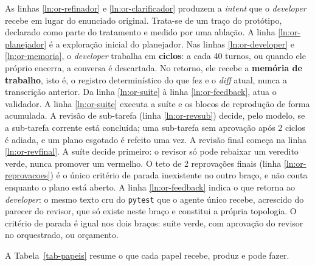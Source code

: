 As linhas \ref{ln:or-refinador} e \ref{ln:or-clarificador} produzem a \textit{intent} que o \textit{developer} recebe em lugar do enunciado original. Trata-se de um traço do protótipo, declarado como parte do tratamento e medido por uma ablação. A linha \ref{ln:or-planejador} é a exploração inicial do planejador. Nas linhas \ref{ln:or-developer} e \ref{ln:or-memoria}, o \textit{developer} trabalha em \textbf{ciclos}: a cada 40 turnos, ou quando ele próprio encerra, a conversa é descartada. No retorno, ele recebe a \textbf{memória de trabalho}, isto é, o registro determinístico do que fez e o \textit{diff} atual, nunca a transcrição anterior. Da linha \ref{ln:or-suite} à linha \ref{ln:or-feedback}, atua o validador. A linha \ref{ln:or-suite} executa a suíte e os blocos de reprodução de forma acumulada. A revisão de sub-tarefa (linha \ref{ln:or-revsub}) decide, pelo modelo, se a sub-tarefa corrente está concluída; uma sub-tarefa sem aprovação após 2 ciclos é adiada, e um plano esgotado é refeito uma vez. A revisão final começa na linha \ref{ln:or-revfinal}. A suíte decide primeiro: o revisor só pode rebaixar um veredito verde, nunca promover um vermelho. O teto de 2 reprovações finais (linha \ref{ln:or-reprovacoes}) é o único critério de parada inexistente no outro braço, e não conta enquanto o plano está aberto. A linha \ref{ln:or-feedback} indica o que retorna ao \textit{developer}: o mesmo texto cru do \texttt{pytest} que o agente único recebe, acrescido do parecer do revisor, que só existe neste braço e constitui a própria topologia. O critério de parada é igual nos dois braços: suíte verde, com aprovação do revisor no orquestrado, ou orçamento.

A Tabela~\ref{tab-papeis} resume o que cada papel recebe, produz e pode fazer.

